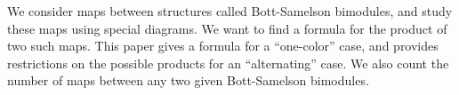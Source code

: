
We consider maps between structures called Bott-Samelson bimodules, and study these maps using special diagrams.  We want to find a formula for the product of two such maps.  This paper gives a formula for a ``one-color'' case, and provides restrictions on the possible products for an ``alternating'' case.  We also count the number of maps between any two given Bott-Samelson bimodules.

